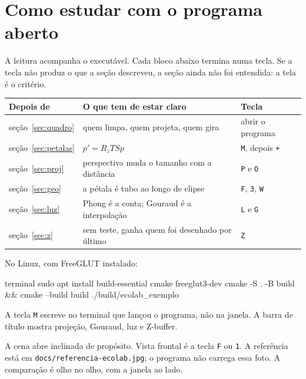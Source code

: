 \documentclass[11pt,a4paper]{article}
\newcommand{\fn}[1]{\texttt{\nobreak\hspace{0pt}#1}}
\begin{document}
\clearpage
{}
\pagestyle{plain}
{\setlength{\parskip}{0pt}\tableofcontents}
\clearpage
{}
\pagestyle{fancy}

\section{Como estudar com o programa aberto}

A leitura acompanha o executável. Cada bloco abaixo termina numa tecla. Se a tecla não produz o que a seção descreveu, a seção ainda não foi entendida: a tela é o critério.

\begin{center}
\small
\begin{tabularx}{\linewidth}{@{}l X l@{}}
\toprule
Depois de & O que tem de estar claro & Tecla \\
\midrule
seção~\ref{sec:quadro} & quem limpa, quem projeta, quem gira & abrir o programa \\
seção~\ref{sec:petalas} & \(p' = R_z T S p\) & \fn{M}, depois \fn{+} \\
seção~\ref{sec:proj} & perspectiva muda o tamanho com a distância & \fn{P} e \fn{O} \\
seção~\ref{sec:geo} & a pétala é tubo ao longo de elipse & \fn{F}, \fn{3}, \fn{W} \\
seção~\ref{sec:luz} & Phong é a conta; Gouraud é a interpolação & \fn{L} e \fn{G} \\
seção~\ref{sec:z} & sem teste, ganha quem foi desenhado por último & \fn{Z} \\
\bottomrule
\end{tabularx}
\end{center}

No Linux, com FreeGLUT instalado:

\begin{codigo}{terminal}
sudo apt install build-essential cmake freeglut3-dev
cmake -S . -B build && cmake --build build
./build/ecolab_exemplo
\end{codigo}

A tecla \fn{M} escreve no terminal que lançou o programa, não na janela. A barra de título mostra projeção, Gouraud, luz e Z-buffer.

\begin{voz}
A cena abre inclinada de propósito. Vista frontal é a tecla \fn{F} ou \fn{1}. A referência está em \fn{docs/referencia-ecolab.jpg}; o programa não carrega essa foto. A comparação é olho no olho, com a janela ao lado.
\end{voz}
\end{document}
